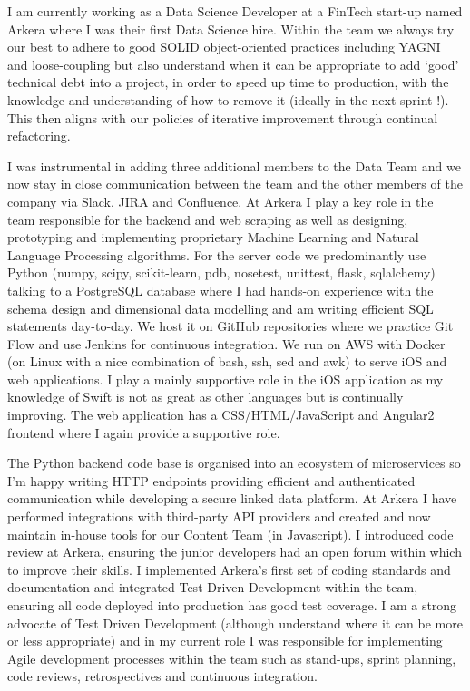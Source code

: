 \documentclass[11pt,a4paper,sans]{moderncv}        %
\begin{document}
I am currently working as a Data Science Developer at a FinTech start-up named Arkera where I was their first Data Science hire. Within the team we always try our best to adhere to good SOLID object-oriented practices including YAGNI and loose-coupling but also understand when it can be appropriate to add `good' technical debt into a project, in order to speed up time to production, with the knowledge and understanding of how to remove it (ideally in the next sprint !). This then aligns with our policies of iterative improvement through continual refactoring.

I was instrumental in adding three additional members to the Data Team and we now stay in close communication between the team and the other members of the company via Slack, JIRA and Confluence. At Arkera I play a key role in the team responsible for the backend and web scraping as well as designing, prototyping and implementing proprietary Machine Learning and Natural Language Processing algorithms. For the server code we predominantly use Python (numpy, scipy, scikit-learn, pdb, nosetest, unittest, flask, sqlalchemy) talking to a PostgreSQL database where I had hands-on experience with the schema design and dimensional data modelling and am writing efficient SQL statements day-to-day. We host it on GitHub repositories where we practice Git Flow and use Jenkins for continuous integration. We run on AWS with Docker (on Linux with a nice combination of bash, ssh, sed and awk) to serve iOS and web applications. I play a mainly supportive role in the iOS application as my knowledge of Swift is not as great as other languages but is continually improving. The web application has a CSS/HTML/JavaScript and Angular2 frontend where I again provide a supportive role. 

The Python backend code base is organised into an ecosystem of microservices so I'm happy writing HTTP endpoints providing efficient and authenticated communication while developing a secure linked data platform. At Arkera I have performed integrations with third-party API providers and created and now maintain in-house tools for our Content Team (in Javascript). I introduced code review at Arkera, ensuring the junior developers had an open forum within which to improve their skills. I implemented Arkera's first set of coding standards and documentation and integrated Test-Driven Development within the team, ensuring all code deployed into production has good test coverage. I am a strong advocate of Test Driven Development (although understand where it can be more or less appropriate) and in my current role I was responsible for implementing Agile development processes within the team such as stand-ups, sprint planning, code reviews, retrospectives and continuous integration.
\end{document}
